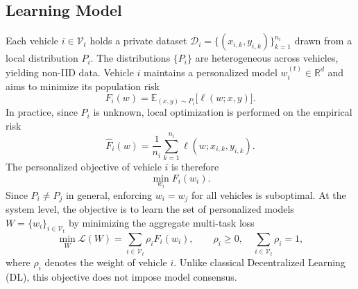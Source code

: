 
\subsection{Learning Model}
\label{subsec:learning}

Each vehicle $i\in\mathcal{V}_t$ holds a private dataset $\mathcal{D}_i=\{(x_{i,k},y_{i,k})\}_{k=1}^{n_i}$ drawn from a local distribution $P_i$. The distributions $\{P_i\}$ are heterogeneous across vehicles, yielding non-IID data. Vehicle $i$ maintains a personalized model $w_i^{(t)}\in\mathbb{R}^d$ and aims to minimize its population risk
%
\begin{equation*}
    F_i(w)=\mathbb{E}_{(x,y)\sim P_i}\bigl[\ell(w;x,y)\bigr].
\end{equation*}
%
In practice, since $P_i$ is unknown, local optimization is performed on the empirical risk
%
\begin{equation*}
    \hat{F}_i(w)=\frac{1}{n_i}\sum_{k=1}^{n_i}\ell(w;x_{i,k},y_{i,k}).
\end{equation*}
%
The personalized objective of vehicle $i$ is therefore
\begin{equation*}
    \min_{w_i} F_i(w_i).
\end{equation*}
%
Since $P_i\neq P_j$ in general, enforcing $w_i=w_j$ for all vehicles is suboptimal. At the system level, the objective is to learn the set of personalized models $W=\{w_i\}_{i\in\mathcal{V}_t}$ by minimizing the aggregate multi-task loss
\begin{equation*}
    \min_W \mathcal{L}(W) = \sum_{i\in\mathcal{V}_t}\rho_i F_i(w_i),
    \qquad
    \rho_i\geq 0,
    \quad
    \sum_{i\in\mathcal{V}_t}\rho_i=1,
\end{equation*}
%
where $\rho_i$ denotes the weight of vehicle $i$. Unlike classical Decentralized Learning (DL), this objective does not impose model consensus.

